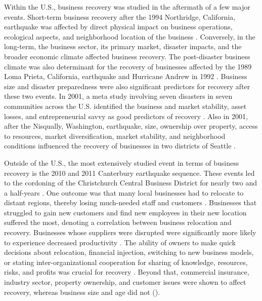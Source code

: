 Within the U.S., business recovery was studied in the aftermath of a few major events. Short-term business recovery after the 1994 Northridge, California, earthquake was affected by direct physical impact on business operations, ecological aspects, and neighborhood location of the business \citep{dahlhamer1998rebounding}. Conversely, in the long-term, the business sector, its primary market, disaster impacts, and the broader economic climate affected business recovery. The post-disaster business climate was also determinant for the recovery of businesses affected by the 1989 Loma Prieta, California, earthquake and Hurricane Andrew in 1992 \citep{webb2002predicting}. Business size and disaster preparedness were also significant predictors for recovery after these two events. In 2001, a meta study involving seven disasters in seven communities across the U.S. identified the business and market stability, asset losses, and entrepreneurial savvy as good predictors of recovery \citep{alesch2001organizations}. Also in 2001, after the Nisqually, Washington, earthquake, size, ownership over property, access to resources, market diversification, market stability, and neighborhood conditions influenced the recovery of businesses in two districts of Seattle \citep{chang2002disaster}. \

Outside of the U.S., the most extensively studied event in terms of business recovery is the 2010 and 2011 Canterbury earthquake sequence. These events led to the cordoning of the Christchurch Central Business District for nearly two and a half-years \citep{brown2019business}. One outcome was that many local businesses had to relocate to distant regions, thereby losing much-needed staff and customers \citep{morrish2020post}. Businesses that struggled to gain new customers and find new employees in their new location suffered the most, denoting a correlation between business relocation and recovery. Businesses whose suppliers were disrupted were significantly more likely to experience decreased productivity \citep{brown2019business}. The ability of owners to make quick decisions about relocation, financial injection, switching to new business models, or stating inter-organizational cooperation for sharing of knowledge, resources, risks, and profits was crucial for recovery \citep{stevenson2014organizational, morrish2011entrepreneurial}. Beyond that, commercial insurance, industry sector, property ownership, and customer issues were shown to affect recovery, whereas business size and age did not (\cite{brown2017efficacy, brown2015factors, kachali2015industry}). \

